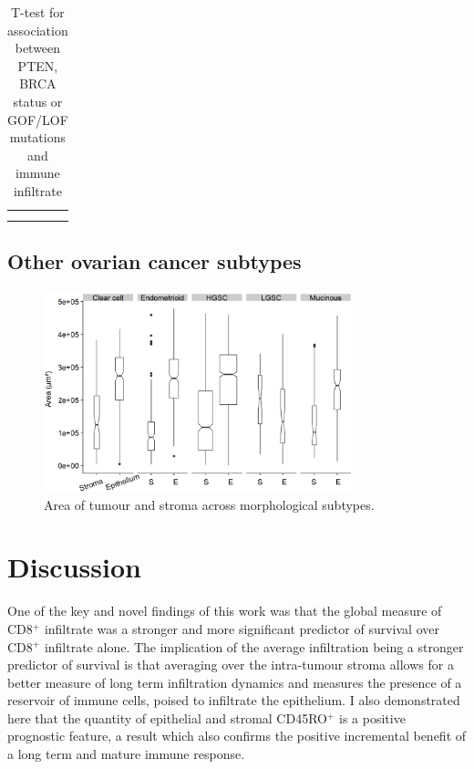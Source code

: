 \begin{table}[]
    \centering
    \begin{tabular}{c|c}
         &  \\
         & 
    \end{tabular}
    \caption{T-test for association between PTEN, BRCA status or GOF/LOF mutations and immune infiltrate }
    \label{tab:my_label}
\end{table}

\subsection{Other ovarian cancer subtypes}

\begin{figure}
    \centering
    \includegraphics[width=0.8\textwidth]{Chapter2/Figs/Raster/Morphology_area.png}
    \caption{Area of tumour and stroma across morphological subtypes.}
    \label{fig:morph_area}
\end{figure}

\clearpage

\section{Discussion}
 One of the key and novel findings of this work was that the global measure of CD8$^+$ infiltrate was a stronger and more significant predictor of survival over CD8$^+$ infiltrate alone. The implication of the average infiltration being a stronger predictor of survival is that averaging over the intra-tumour stroma allows for a better measure of long term infiltration dynamics and measures the presence of a reservoir of immune cells, poised to infiltrate the epithelium.  I also demonstrated here that the quantity of epithelial and stromal CD45RO$^+$ is a positive prognostic feature, a result which also confirms the positive incremental benefit of a long term and mature immune response. 
 
